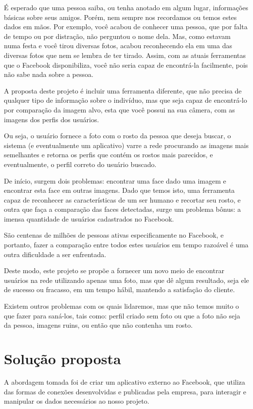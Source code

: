\documentclass[10pt,a4paper]{article}
\begin{document}
	É esperado que uma pessoa saiba, ou tenha anotado em algum lugar, informações básicas sobre seus amigos. Porém, nem sempre nos recordamos ou temos estes dados em mãos. Por exemplo, você acabou de conhecer uma pessoa, que por falta de tempo ou por distração, não perguntou o nome dela. Mas, como estavam numa festa e você tirou diversas fotos, acabou reconhecendo ela em uma das diversas fotos que nem se lembra de ter tirado. Assim, com as atuais ferramentas que o Facebook disponibiliza, você não seria capaz de encontrá-la facilmente, pois não sabe nada sobre a pessoa.

A proposta deste projeto é incluir uma ferramenta diferente, que não precisa de qualquer tipo de informação sobre o indivíduo, mas que seja capaz de encontrá-lo por comparação da imagem alvo, esta que você possui na sua câmera, com as imagens dos perfis dos usuários.

	Ou seja, o usuário fornece a foto com o rosto da pessoa que deseja buscar, o sistema (e eventualmente um aplicativo) varre a rede procurando as imagens mais semelhantes e retorna os perfis que contém os rostos mais parecidos, e eventualmente, o perfil correto do usuário buscado.

	De início, surgem dois problemas: encontrar uma face dado uma imagem e encontrar esta face em outras imagens. Dado que temos isto, uma ferramenta capaz de reconhecer as características de um ser humano e recortar seu rosto, e outra que faça a comparação das faces detectadas, surge um problema bônus: a imensa quantidade de usuários cadastrados no Facebook.

	São centenas de milhões de pessoas ativas especificamente no Facebook, e portanto, fazer a comparação entre todos estes usuários em tempo razoável é uma outra dificuldade a ser enfrentada.

	Deste modo, este projeto se propõe a fornecer um novo meio de encontrar usuários na rede utilizando apenas uma foto, mas que dê algum resultado, seja ele de sucesso ou fracasso, em um tempo hábil, mantendo a satisfação do cliente.

	Existem outros problemas com os quais lidaremos, mas que não temos muito o que fazer para saná-los, tais como: perfil criado sem foto ou que a foto não seja da pessoa, imagens ruins, ou então que não contenha um rosto.

\section{Solução proposta}
A abordagem tomada foi de criar um aplicativo externo ao Facebook, que utiliza das formas de conexões desenvolvidas e publicadas pela empresa, para interagir e manipular os dados necessários ao nosso projeto.
\end{document}
